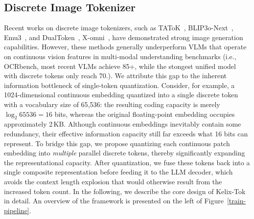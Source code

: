 \documentclass[11pt, a4paper, logo, copyright]{googledeepmind}
\begin{document}


\subsection{Discrete Image Tokenizer}
\label{sec:discrete_image_tokenizer}
Recent works on discrete image tokenizers, such as TAToK~\citep{kim2025democratizing}, BLIP3o-Next~\citep{chen2025blip3o}, Emu3~\citep{wang2024emu3}, and DualToken~\citep{song2025dualtoken}, X-omni~\cite{geng2025xomnireinforcementlearningmakes}, have demonstrated strong image generation capabilities.
%
However, these methods generally underperform VLMs that operate on continuous vision features in multi-modal understanding benchmarks (i.e., OCRbench, most recent VLMs achieve 85+, while the stongest unified model with discrete tokens only reach 70.). We attribute this gap to the inherent information bottleneck of single-token quantization. Consider, for example, a 1024-dimensional continuous embedding quantized into a single discrete token with a vocabulary size of 65{,}536: the resulting coding capacity is merely $\log_2 65536 = 16$ bits, whereas the original floating-point embedding occupies approximately 2\,KB. Although continuous embeddings inevitably contain some redundancy, their effective information capacity still far exceeds what 16 bits can represent.
%
To bridge this gap, we propose quantizing each continuous patch embedding into \emph{multiple} parallel discrete tokens, thereby significantly expanding the representational capacity. After quantization, we fuse these tokens back into a single composite representation before feeding it to the LLM decoder, which avoids the context length explosion that would otherwise result from the increased token count.
%
In the following, we describe the core design of Kelix-Tok in detail. An overview of the framework is presented on the left of Figure~\ref{train-pipeline}.
\end{document}
